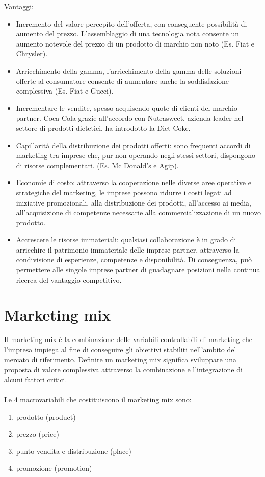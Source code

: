 Vantaggi:
\begin{itemize}
	\item Incremento del valore percepito dell’offerta, con conseguente possibilità di	aumento del prezzo. L’assemblaggio di una tecnologia nota consente un aumento notevole del prezzo di un prodotto di marchio non noto (Es. Fiat e Chrysler).
	\item Arricchimento della gamma, l’arricchimento della gamma delle soluzioni offerte al consumatore consente di aumentare anche la soddisfazione complessiva (Es. Fiat e Gucci).
	\item Incrementare le vendite, spesso acquisendo quote di clienti del marchio partner. Coca Cola grazie all’accordo con Nutrasweet, azienda leader nel settore di prodotti dietetici, ha introdotto la Diet Coke.
	\item Capillarità della distribuzione dei prodotti offerti: sono frequenti accordi di marketing tra imprese che, pur non operando negli stessi settori, dispongono di risorse complementari. (Es. Mc Donald’s e Agip).
	\item Economie di costo: attraverso la cooperazione nelle diverse aree operative e strategiche del marketing, le imprese possono ridurre i costi legati ad iniziative promozionali, alla distribuzione dei prodotti, all’accesso ai media, all’acquisizione di competenze necessarie alla commercializzazione di un nuovo prodotto.
	\item Accrescere le risorse immateriali: qualsiasi collaborazione è in grado di arricchire il patrimonio immateriale delle imprese partner, attraverso la condivisione di esperienze, competenze e disponibilità. Di conseguenza, può permettere alle singole imprese partner di guadagnare posizioni nella continua ricerca del vantaggio competitivo.
\end{itemize}
\chapter{Marketing mix}
Il marketing mix è la combinazione delle variabili controllabili di marketing che l’impresa impiega al fine di conseguire gli obiettivi stabiliti nell’ambito del mercato di riferimento. Definire un marketing mix significa sviluppare una proposta di valore complessiva attraverso la combinazione e l’integrazione di alcuni fattori critici.
\\
\\
Le 4 macrovariabili che costituiscono il marketing mix sono:
\begin{enumerate}
	\item prodotto (product)
	\item prezzo (price)
	\item punto vendita e distribuzione (place)
	\item promozione (promotion)
\end{enumerate}

